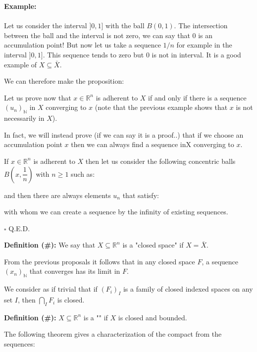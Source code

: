 	\begin{tcolorbox}[colframe=black,colback=white,sharp corners]
	\textbf{{\Large {}}Example:}\\\\
	Let us consider the interval $]0,1]$ with the ball $B(0,1)$. The intersection between the ball and the interval is not zero, we can say that $0$ is an accumulation point! But now let us take a sequence $1 / n$ for example in the interval $]0,1]$. This sequence tends to zero but $0$ is not in interval. It is a good example of $X \subseteq \bar{X}$.
	\end{tcolorbox}
	We can therefore make the proposition:
	\begin{theorem}
	Let us prove now that $x\in \mathbb{R}^n$ is adherent to $X$ if and only if there is a sequence $\left(u_n\right)_{\mathbb{N}}$ in $X$ converging to $x$ (note that the previous example shows that $x$ is not necessarily in $X$).
	
	In fact, we will instead prove (if we can say it is a proof..) that if we choose an accumulation point $x$ then we can always find a sequence in$ $X converging to $x$.
	\end{theorem}
	\begin{dem}
	If $x\in \mathbb{R}^n$ is adherent to $X$ then let us consider the following concentric balls $B\left(x,\dfrac{1}{n}\right)$ with $n\geq 1$ such as:
	
	and then there are always elements $u_n$ that satisfy:
	
	with whom we can create a sequence by the infinity of existing sequences.
	\begin{flushright}
		$\square$  Q.E.D.
	\end{flushright}
	\end{dem}	
	\textbf{Definition (\#\mydef):} We say that $X\subseteq \mathbb{R}^n$ is a "closed space" if $X=\bar{X}$.
	
	From the previous proposals it follows that in any closed space $F$, a sequence $(x_n)_{\mathbb{N}}$ that converges has its limit in $F$.
	
	We consider as if trivial that if $(F_i)_I$ is a family of closed indexed spaces on any set $I$, then $\bigcap_I F_i$ is closed.
	
	\textbf{Definition (\#\mydef):} $X\subseteq \mathbb{R}^n$ is a "" if $X$ is closed and bounded.
	
	The following theorem gives a characterization of the compact from the sequences:
	
